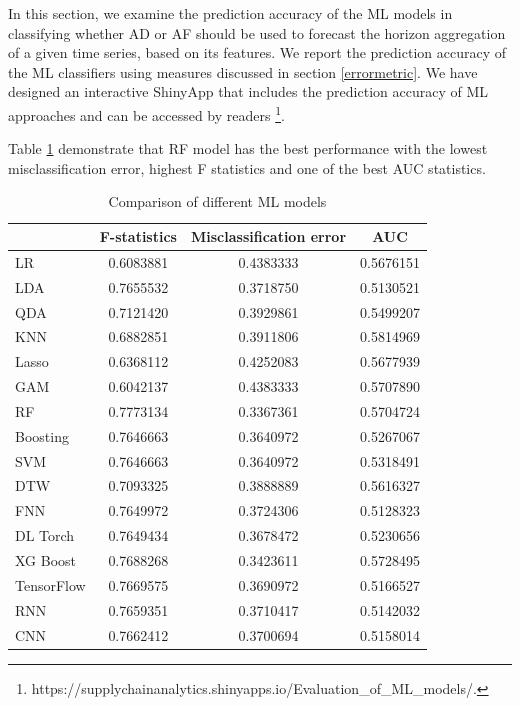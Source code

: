 \documentclass[preprint, 3p,
authoryear]{elsarticle} %
\begin{document}
In this section, we examine the prediction accuracy of the ML models in
classifying whether AD or AF should be used to forecast the horizon
aggregation of a given time series, based on its features. We report the
prediction accuracy of the ML classifiers using measures discussed in
section \ref{errormetric}. We have designed an interactive ShinyApp that
includes the prediction accuracy of ML approaches and can be accessed by
readers \footnote{https://supplychainanalytics.shinyapps.io/Evaluation\_of\_ML\_models/.}.

Table \ref{tab:cost} demonstrate that RF model has the best performance
with the lowest misclassification error, highest F statistics and one of
the best AUC statistics.

\begin{table}
\caption{\label{tab:cost}Comparison of different ML models}
\centering
\begin{tabular}[t]{lccc}
\hline
 & F-statistics & Misclassification error & AUC\\
\hline
LR &  0.6083881 &  0.4383333 & 0.5676151\\
\hline
LDA & 0.7655532 & 0.3718750 & 0.5130521\\
\hline
QDA &  0.7121420 & 0.3929861 & 0.5499207\\
\hline
KNN &  0.6882851 & 0.3911806 & 0.5814969\\
\hline
Lasso & 0.6368112 & 0.4252083 & 0.5677939\\
\hline
GAM &  0.6042137 & 0.4383333 & 0.5707890\\
\hline
RF & 0.7773134 & 0.3367361 & 0.5704724\\
\hline
Boosting & 0.7646663 & 0.3640972 & 0.5267067\\
\hline
SVM & 0.7646663 & 0.3640972 & 0.5318491\\
\hline
DTW & 0.7093325 & 0.3888889 & 0.5616327\\
\hline
FNN & 0.7649972 & 0.3724306 & 0.5128323\\
\hline
DL Torch & 0.7649434 & 0.3678472 & 0.5230656\\
\hline
XG Boost & 0.7688268 & 0.3423611 & 0.5728495\\
\hline
TensorFlow & 0.7669575 & 0.3690972 & 0.5166527\\
\hline
RNN & 0.7659351 & 0.3710417 & 0.5142032\\
\hline
CNN & 0.7662412 & 0.3700694 & 0.5158014\\
\hline
\end{tabular}
\end{table}
\end{document}
